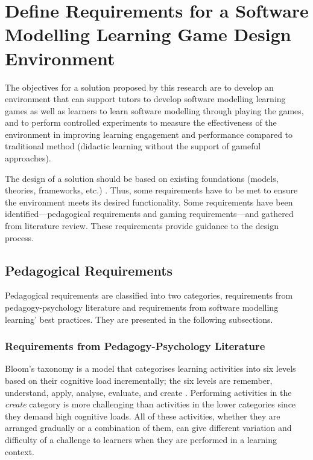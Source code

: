 \documentclass[12pt, a4paper]{report} \usepackage[titletoc]{appendix}
\begin{document}
\section{Define Requirements for a Software Modelling Learning Game Design Environment}
The objectives for a solution proposed by this research are to develop an environment that can support tutors to develop software modelling learning games as well as learners to learn software modelling through playing the games, and to perform controlled experiments to measure the effectiveness of the environment in improving learning engagement and performance compared to traditional method (didactic learning without the support of gameful approaches).

The design of a solution should be based on existing foundations (models, theories, frameworks, etc.) \cite{von2004design}. Thus, some requirements have to be met to ensure the environment meets its desired functionality. Some requirements have been identified---pedagogical requirements and gaming requirements---and gathered from literature review. These requirements provide guidance to the design process.

\subsection{Pedagogical Requirements}
\label{Pedagogical Requirements}
Pedagogical requirements are classified into two categories, requirements from pedagogy-psychology literature and requirements from software modelling learning' best practices. They are presented in the following subsections. 

\subsubsection{Requirements from Pedagogy-Psychology Literature}
\label{Requirements from Pedagogy-Psychology Literature}
Bloom's taxonomy is a model that categorises learning activities into six levels based on their cognitive load incrementally; the six levels are remember, understand, apply, analyse, evaluate, and create \cite{krathwohl2002revision}. Performing activities in the \emph{create} category is more challenging than activities in the lower categories since they demand high cognitive loads. All of these activities, whether they are arranged gradually or a combination of them, can give different variation and difficulty of a challenge to learners when they are performed in a learning context. 
\end{document}
